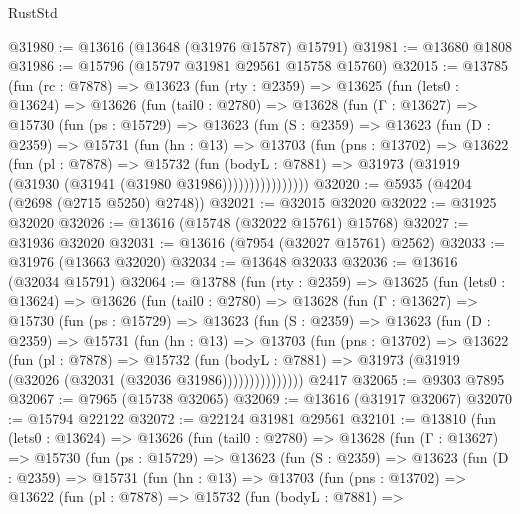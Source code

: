 \begin{lexlean}{RustStd}
\begin{coremodule}
@31980 := @13616 (@13648 (@31976 @15787) @15791)
@31981 := @13680 @1808
@31986 := @15796 (@15797 @31981 @29561 @15758 @15760)
@32015 := @13785
    (fun (rc : @7878) =>
    @13623
      (fun (rty : @2359) =>
      @13625
        (fun (lets0 : @13624) =>
        @13626
          (fun (tail0 : @2780) =>
          @13628
            (fun (Γ : @13627) =>
            @15730
              (fun (ps : @15729) =>
              @13623
                (fun (S : @2359) =>
                @13623
                  (fun (D : @2359) =>
                  @15731
                    (fun (hn : @13) =>
                    @13703
                      (fun (pns : @13702) =>
                      @13622
                        (fun (pl : @7878) =>
                        @15732
                          (fun (bodyL : @7881) =>
                          @31973 (@31919 (@31930 (@31941 (@31980 @31986))))))))))))))))
@32020 := @5935 (@4204 (@2698 (@2715 @5250) @2748))
@32021 := @32015 @32020
@32022 := @31925 @32020
@32026 := @13616 (@15748 (@32022 @15761) @15768)
@32027 := @31936 @32020
@32031 := @13616 (@7954 (@32027 @15761) @2562)
@32033 := @31976 (@13663 @32020)
@32034 := @13648 @32033
@32036 := @13616 (@32034 @15791)
@32064 := @13788
    (fun (rty : @2359) =>
    @13625
      (fun (lets0 : @13624) =>
      @13626
        (fun (tail0 : @2780) =>
        @13628
          (fun (Γ : @13627) =>
          @15730
            (fun (ps : @15729) =>
            @13623
              (fun (S : @2359) =>
              @13623
                (fun (D : @2359) =>
                @15731
                  (fun (hn : @13) =>
                  @13703
                    (fun (pns : @13702) =>
                    @13622
                      (fun (pl : @7878) =>
                      @15732
                        (fun (bodyL : @7881) =>
                        @31973 (@31919 (@32026 (@32031 (@32036 @31986)))))))))))))))
    @2417
@32065 := @9303 @7895
@32067 := @7965 (@15738 @32065)
@32069 := @13616 (@31917 @32067)
@32070 := @15794 @22122
@32072 := @22124 @31981 @29561
@32101 := @13810
    (fun (lets0 : @13624) =>
    @13626
      (fun (tail0 : @2780) =>
      @13628
        (fun (Γ : @13627) =>
        @15730
          (fun (ps : @15729) =>
          @13623
            (fun (S : @2359) =>
            @13623
              (fun (D : @2359) =>
              @15731
                (fun (hn : @13) =>
                @13703
                  (fun (pns : @13702) =>
                  @13622
                    (fun (pl : @7878) =>
                    @15732
                      (fun (bodyL : @7881) =>

\end{coremodule}
\end{lexlean}
